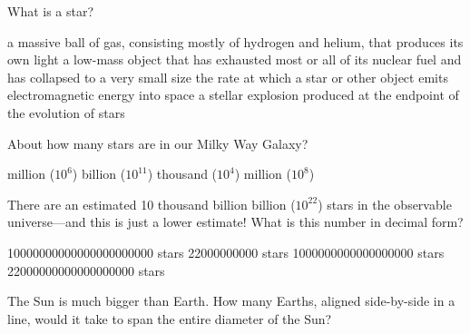 \documentclass[addpoints]{exam}
\begin{document}
\begin{questions}

\question
What is a star?

\begin{randomizechoices}
\correctchoice a massive ball of gas, consisting mostly of hydrogen and helium, that produces its own light
\choice a low-mass object that has exhausted most or all of its nuclear fuel and has collapsed to a very small size
\choice the rate at which a star or other object emits electromagnetic energy into space
\choice a stellar explosion produced at the endpoint of the evolution of stars
\end{randomizechoices}

\question
About how many stars are in our Milky Way Galaxy?

\begin{randomizechoices}
 million ($10^6$)
 billion ($10^{11}$)
 thousand ($10^4$)
 million ($10^8$) 
\end{randomizechoices}

\question
There are an estimated 10 thousand billion billion ($10^{22}$) stars in the observable universe---and this is just a lower estimate! What is this number in decimal form?

\begin{randomizechoices}
\correctchoice \SI{10000000000000000000000}{} stars
\choice \SI{22000000000}{} stars
\choice \SI{1000000000000000000}{} stars
\choice \SI{22000000000000000000}{} stars
\end{randomizechoices}

\question
The Sun is much bigger than Earth. How many Earths, aligned side-by-side in a line, would it take to span the entire diameter of the Sun?

\begin{center}
\end{center}


\end{questions}
\end{document}
